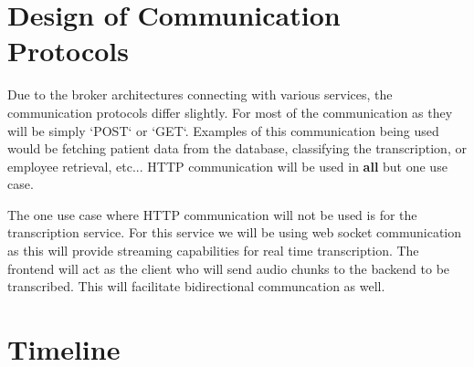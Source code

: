 \documentclass[12pt, titlepage]{article}
\begin{document}
\section{Design of Communication Protocols}

Due to the broker architectures connecting with various services, the communication protocols differ slightly. For most of the communication as they will be simply `POST` or `GET`. Examples of this communication being used would be fetching patient data from the database, classifying the transcription, or employee retrieval, etc... HTTP communication will be used in \textbf{all} but one use case.

The one use case where HTTP communication will not be used is for the transcription service. For this service we will be using web socket communication as this will provide streaming capabilities for real time transcription. The frontend will act as the client who will send audio chunks to the backend to be transcribed. This will facilitate bidirectional communcation as well.


\section{Timeline}
\end{document}
